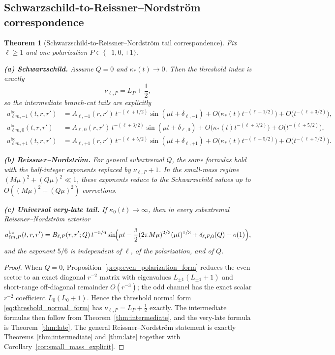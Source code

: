 \documentclass[12pt]{article}
\numberwithin{equation}{section}
\theoremstyle{plain}
\newtheorem{theorem}{Theorem}[section]
\theoremstyle{definition}
\theoremstyle{remark}
\newcommand{\bc}{\mathrm{bc}}
\newcommand{\kap}{\kappa}
\begin{document}
\subsection{Schwarzschild-to-Reissner--Nordstr\"om correspondence}

\begin{theorem}[Schwarzschild-to-Reissner--Nordstr\"om tail correspondence]\label{thm:schwarzschild_to_rn}
Fix $\ell\ge1$ and one polarization $P\in\{-1,0,+1\}$.

\smallskip
\noindent\textbf{(a) Schwarzschild.}
Assume $Q=0$ and $\kap_*(t)\to0$.  Then the threshold index is exactly
\[
   \nu_{\ell,P}=L_P+\frac12,
\]
so the intermediate branch-cut tails are explicitly
\begin{align*}
   u_{\ell m,-1}^{\bc}(t,r,r')
   &=A_{\ell,-1}(r,r')\,t^{-(\ell+1/2)}\sin(\mu t+\delta_{\ell,-1})
   +O\!\bigl(\kap_*(t)t^{-(\ell+1/2)}\bigr)
   +O\!\bigl(t^{-(\ell+3/2)}\bigr),
   \\
   u_{\ell m,0}^{\bc}(t,r,r')
   &=A_{\ell,0}(r,r')\,t^{-(\ell+3/2)}\sin(\mu t+\delta_{\ell,0})
   +O\!\bigl(\kap_*(t)t^{-(\ell+3/2)}\bigr)
   +O\!\bigl(t^{-(\ell+5/2)}\bigr),
   \\
   u_{\ell m,+1}^{\bc}(t,r,r')
   &=A_{\ell,+1}(r,r')\,t^{-(\ell+5/2)}\sin(\mu t+\delta_{\ell,+1})
   +O\!\bigl(\kap_*(t)t^{-(\ell+5/2)}\bigr)
   +O\!\bigl(t^{-(\ell+7/2)}\bigr).
\end{align*}

\smallskip
\noindent\textbf{(b) Reissner--Nordstr\"om.}
For general subextremal $Q$, the same formulas hold with the half-integer exponents replaced by $\nu_{\ell,P}+1$.  In the small-mass regime $(M\mu)^2+(Q\mu)^2\ll1$, these exponents reduce to the Schwarzschild values up to $O((M\mu)^2+(Q\mu)^2)$ corrections.

\smallskip
\noindent\textbf{(c) Universal very-late tail.}
If $\kap_0(t)\to\infty$, then in every subextremal Reissner--Nordstr\"om exterior
\[
   u_{\ell m,P}^{\bc}(t,r,r')
   =
   B_{\ell,P}(r,r';Q)\,t^{-5/6}
   \sin\!\Bigl(
      \mu t-\frac32(2\pi M\mu)^{2/3}(\mu t)^{1/3}+\delta_{\ell,P,0}(Q)+o(1)
   \Bigr),
\]
and the exponent $5/6$ is independent of $\ell$, of the polarization, and of $Q$.
\end{theorem}

\begin{proof}
When $Q=0$, Proposition~\ref{prop:even_polarization_form} reduces the even sector to an exact diagonal $r^{-2}$ matrix with eigenvalues $L_{\pm1}(L_{\pm1}+1)$ and short-range off-diagonal remainder $O(r^{-3})$; the odd channel has the exact scalar $r^{-2}$ coefficient $L_0(L_0+1)$.  Hence the threshold normal form \eqref{eq:threshold_normal_form} has $\nu_{\ell,P}=L_P+\frac12$ exactly.  The intermediate formulas then follow from Theorem~\ref{thm:intermediate}, and the very-late formula is Theorem~\ref{thm:late}.  The general Reissner--Nordstr\"om statement is exactly Theorems~\ref{thm:intermediate} and \ref{thm:late} together with Corollary~\ref{cor:small_mass_explicit}.
\end{proof}
\end{document}
